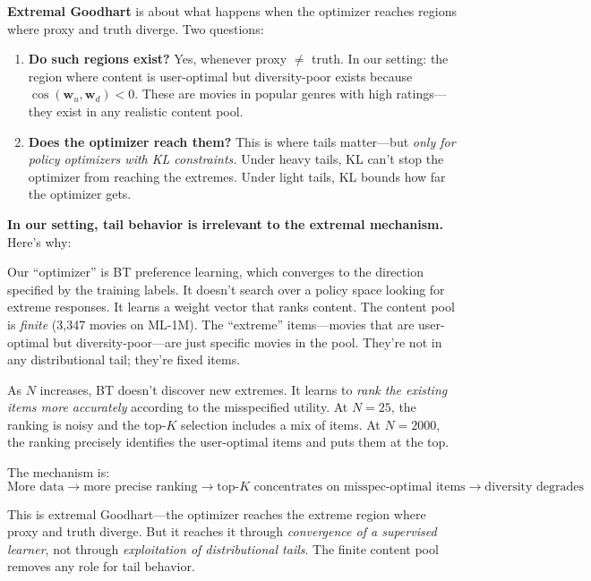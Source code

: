 \documentclass[11pt]{article}
\begin{document}
\textbf{Extremal Goodhart} is about what happens when the optimizer
reaches regions where proxy and truth diverge. Two questions:
\begin{enumerate}
  \item \textbf{Do such regions exist?} Yes, whenever proxy $\neq$
    truth. In our setting: the region where content is user-optimal but
    diversity-poor exists because $\cos(\mathbf{w}_u, \mathbf{w}_d) < 0$.
    These are movies in popular genres with high ratings---they exist in
    any realistic content pool.

  \item \textbf{Does the optimizer reach them?} This is where tails
    matter---but \emph{only for policy optimizers with KL constraints.}
    Under heavy tails, KL can't stop the optimizer from reaching the
    extremes. Under light tails, KL bounds how far the optimizer gets.
\end{enumerate}

\textbf{In our setting, tail behavior is irrelevant to the extremal
mechanism.} Here's why:

Our ``optimizer'' is BT preference learning, which converges to the
direction specified by the training labels. It doesn't search over a
policy space looking for extreme responses. It learns a weight vector
that ranks content. The content pool is \emph{finite} (3{,}347 movies
on ML-1M). The ``extreme'' items---movies that are user-optimal but
diversity-poor---are just specific movies in the pool. They're not in
any distributional tail; they're fixed items.

As $N$ increases, BT doesn't discover new extremes. It learns to
\emph{rank the existing items more accurately} according to the
misspecified utility. At $N = 25$, the ranking is noisy and the
top-$K$ selection includes a mix of items. At $N = 2000$, the ranking
precisely identifies the user-optimal items and puts them at the top.

The mechanism is:
\begin{equation*}
  \text{More data} \to \text{more precise ranking} \to
  \text{top-}K \text{ concentrates on misspec-optimal items} \to
  \text{diversity degrades}
\end{equation*}

This is extremal Goodhart---the optimizer reaches the extreme region
where proxy and truth diverge. But it reaches it through
\emph{convergence of a supervised learner}, not through
\emph{exploitation of distributional tails}. The finite content pool
removes any role for tail behavior.
\end{document}
